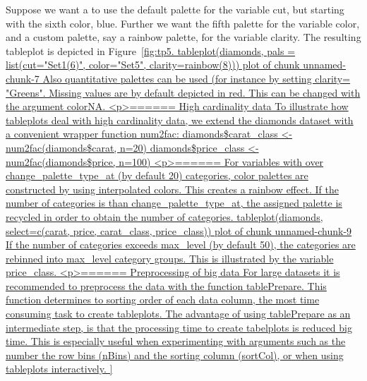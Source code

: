 Suppose we want a to use the default palette for the variable cut, but starting with the sixth color, blue. Further we want the fifth palette for the variable color, and a custom palette, say a rainbow palette, for the variable clarity. The resulting tableplot is depicted in Figure~\ref{fig:tp5.

tableplot(diamonds, pals = list(cut="Set1(6)", color="Set5", clarity=rainbow(8)))
plot of chunk unnamed-chunk-7

Also quantitative palettes can be used (for instance by setting clarity= "Greens". Missing values are by default depicted in red. This can be changed with the argument colorNA.



<p>======

High cardinality data

To illustrate how tableplots deal with high cardinality data, we extend the diamonds dataset with a convenient wrapper function num2fac:

diamonds$carat_class <- num2fac(diamonds$carat, n=20)
diamonds$price_class <- num2fac(diamonds$price, n=100)



<p>======

For variables with over change_palette_type_at (by default 20) categories, color palettes are constructed by using interpolated colors. This creates a rainbow effect. If the number of categories is than change_palette_type_at, the assigned palette is recycled in order to obtain the number of categories.

tableplot(diamonds, select=c(carat, price, carat_class, price_class))
plot of chunk unnamed-chunk-9

If the number of categories exceeds max_level (by default 50), the categories are rebinned into max_level category groups. This is illustrated by the variable price_class.


<p>======



Preprocessing of big data

For large datasets it is recommended to preprocess the data with the function tablePrepare. This function determines to sorting order of each data column, the most time consuming task to create tableplots. The advantage of using tablePrepare as an intermediate step, is that the processing time to create tabelplots is reduced big time. This is especially useful when experimenting with arguments such as the number the row bins (nBins) and the sorting column (sortCol), or when using tableplots interactively.

}
